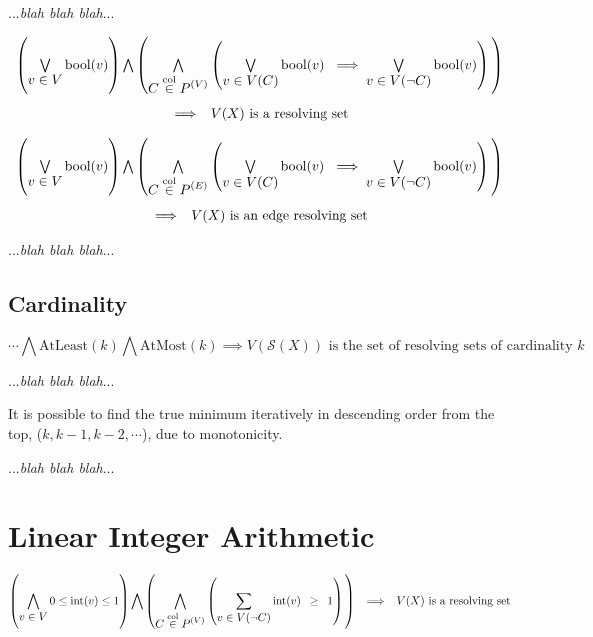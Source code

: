 \documentclass{article}
\newcommand{\combine}[7]{#1 #2 \vphantom{#6} #3 #4 #5 #6 \vphantom{#2} #7}
\begin{document}
...\textit{blah blah blah}...

\[
\begin{array}{c}
	\combine{\left(}{\bigvee \limits_{\displaystyle v \in V} \mathrm{bool}(v)}{\right)}{\bigwedge}{\left(}{\bigwedge \limits_{\displaystyle C \overset{\mathrm{col}}{\in} P^{(V)}} \left( \bigvee \limits_{\displaystyle v \in V(C)} \mathrm{bool}(v)\ \implies \bigvee \limits_{\displaystyle v \in V(\neg C)} \mathrm{bool}(v) \right)}{\right)} \\ [24pt]
	\implies\enspace V(X) \text{ is a resolving set}
\end{array}
\]

\[
\begin{array}{c}
	\combine{\left(}{\bigvee \limits_{\displaystyle v \in V} \mathrm{bool}(v)}{\right)}{\bigwedge}{\left(}{\bigwedge \limits_{\displaystyle C \overset{\mathrm{col}}{\in} P^{(E)}} \left( \bigvee \limits_{\displaystyle v \in V(C)} \mathrm{bool}(v)\ \implies \bigvee \limits_{\displaystyle v \in V(\neg C)} \mathrm{bool}(v) \right)}{\right)} \\ [24pt]
	\implies\enspace V(X) \text{ is an edge resolving set}
\end{array}
\]

...\textit{blah blah blah}...

\clearpage
\subsection{Cardinality}

\[ \cdots \bigwedge \mathrm{AtLeast}(k) \bigwedge \mathrm{AtMost}(k) \implies V(\mathcal{S}(X)) \text{ is the set of resolving sets of cardinality } k \]

...\textit{blah blah blah}...

It is possible to find the true minimum iteratively in descending order from the top, (\(k, k - 1, k - 2, \cdots\)), due to monotonicity.

...\textit{blah blah blah}...

\clearpage
\section{Linear Integer Arithmetic}

\[ \combine{\left(}{\bigwedge \limits_{\displaystyle v \in V} 0 \leq \mathrm{int}(v) \leq 1}{\right)}{\bigwedge}{\left(}{\bigwedge \limits_{\displaystyle C \overset{\mathrm{col}}{\in} P^{(V)}} \left( \sum \limits_{\displaystyle v \in V(\neg C)} \mathrm{int}(v)\enspace \geq\enspace 1 \right)}{\right)}\enspace \implies\enspace V(X) \text{ is a resolving set} \]
\end{document}

